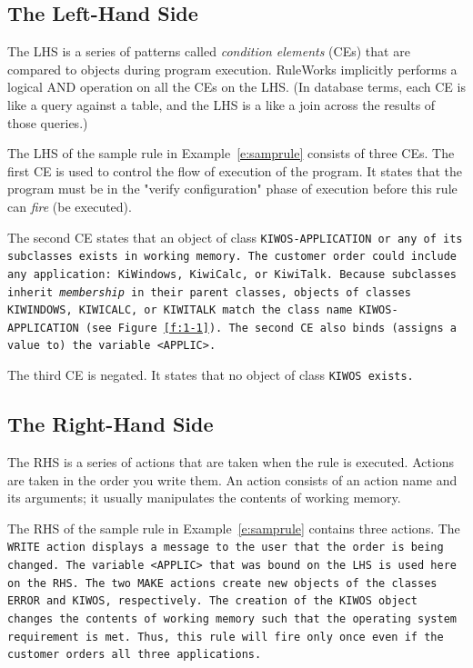 \subsection{The Left-Hand Side}

The LHS is a series of patterns called \emph{condition elements} (CEs)
that are compared to objects during program execution.  RuleWorks
implicitly performs a logical AND operation on all the CEs on the
LHS. (In database terms, each CE is like a query against a table, and
the LHS is a like a join across the results of those queries.)

The LHS of the sample rule in Example~\ref{e:samprule} consists of
three CEs. The first CE is used to control the flow of execution of
the program. It states that the program must be in the "verify
configuration" phase of execution before this rule can \emph{fire} (be
executed).

The second CE states that an object of class \tt{KIWOS-APPLICATION} or
any of its subclasses exists in working memory. The customer order
could include any application: \tt{KiWindows}, \tt{KiwiCalc}, or
\tt{KiwiTalk}. Because subclasses inherit \emph{membership} in their
parent classes, objects of classes \tt{KIWINDOWS}, \tt{KIWICALC}, or
\tt{KIWITALK} match the class name \tt{KIWOS-APPLICATION} (see
Figure~\ref{f:1-1}). The second CE also binds (assigns a value to) the
variable \tt{<APPLIC>}.

The third CE is negated. It states that no object of class \tt{KIWOS}
exists.

\subsection{The Right-Hand Side}

The RHS is a series of actions that are taken when the rule is
executed. Actions are taken in the order you write them. An action
consists of an action name and its arguments; it usually manipulates
the contents of working memory.

The RHS of the sample rule in Example~\ref{e:samprule} contains three
actions. The \tt{WRITE} action displays a message to the user that the
order is being changed. The variable \tt{<APPLIC>} that was bound on
the LHS is used here on the RHS. The two \tt{MAKE} actions create new
objects of the classes \tt{ERROR} and \tt{KIWOS}, respectively. The
creation of the \tt{KIWOS} object changes the contents of working
memory such that the operating system requirement is met. Thus, this
rule will fire only once even if the customer orders all three
applications.

